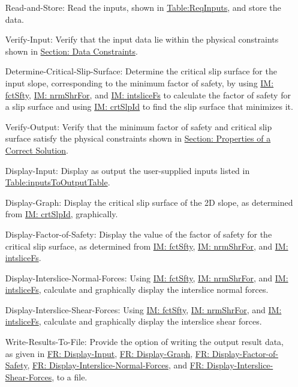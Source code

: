 \documentclass[12pt]{article}
\begin{document}
\begin{itemize}
\item[Read-and-Store:\phantomsection\label{readAndStore}]{Read the inputs, shown in \hyperref[Table:ReqInputs]{Table:ReqInputs}, and store the data.}
\item[Verify-Input:\phantomsection\label{verifyInput}]{Verify that the input data lie within the physical constraints shown in \hyperref[Sec:DataConstraints]{Section: Data Constraints}.}
\item[Determine-Critical-Slip-Surface:\phantomsection\label{determineCritSlip}]{Determine the critical slip surface for the input slope, corresponding to the minimum factor of safety, by using \hyperref[IM:fctSfty]{IM: fctSfty}, \hyperref[IM:nrmShrFor]{IM: nrmShrFor}, and \hyperref[IM:intsliceFs]{IM: intsliceFs} to calculate the factor of safety for a slip surface and using \hyperref[IM:crtSlpId]{IM: crtSlpId} to find the slip surface that minimizes it.}
\item[Verify-Output:\phantomsection\label{verifyOutput}]{Verify that the minimum factor of safety and critical slip surface satisfy the physical constraints shown in \hyperref[Sec:CorSolProps]{Section: Properties of a Correct Solution}.}
\item[Display-Input:\phantomsection\label{displayInput}]{Display as output the user-supplied inputs listed in \hyperref[Table:inputsToOutputTable]{Table:inputsToOutputTable}.}
\item[Display-Graph:\phantomsection\label{displayGraph}]{Display the critical slip surface of the 2D slope, as determined from \hyperref[IM:crtSlpId]{IM: crtSlpId}, graphically.}
\item[Display-Factor-of-Safety:\phantomsection\label{displayFS}]{Display the value of the factor of safety for the critical slip surface, as determined from \hyperref[IM:fctSfty]{IM: fctSfty}, \hyperref[IM:nrmShrFor]{IM: nrmShrFor}, and \hyperref[IM:intsliceFs]{IM: intsliceFs}.}
\item[Display-Interslice-Normal-Forces:\phantomsection\label{displayNormal}]{Using \hyperref[IM:fctSfty]{IM: fctSfty}, \hyperref[IM:nrmShrFor]{IM: nrmShrFor}, and \hyperref[IM:intsliceFs]{IM: intsliceFs}, calculate and graphically display the interslice normal forces.}
\item[Display-Interslice-Shear-Forces:\phantomsection\label{displayShear}]{Using \hyperref[IM:fctSfty]{IM: fctSfty}, \hyperref[IM:nrmShrFor]{IM: nrmShrFor}, and \hyperref[IM:intsliceFs]{IM: intsliceFs}, calculate and graphically display the interslice shear forces.}
\item[Write-Results-To-File:\phantomsection\label{writeToFile}]{Provide the option of writing the output result data, as given in \hyperref[displayInput]{FR: Display-Input}, \hyperref[displayGraph]{FR: Display-Graph}, \hyperref[displayFS]{FR: Display-Factor-of-Safety}, \hyperref[displayNormal]{FR: Display-Interslice-Normal-Forces}, and \hyperref[displayShear]{FR: Display-Interslice-Shear-Forces}, to a file.}
\end{itemize}
\end{document}
